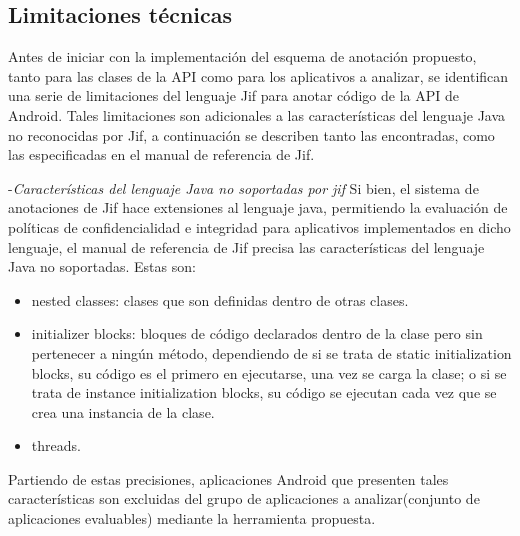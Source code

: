 \subsection{Limitaciones técnicas}
\label{subsec:limitaciones}
Antes de iniciar con la implementación del esquema de anotación propuesto, tanto
para las clases de la API como para los aplicativos a analizar, se
identifican una serie de limitaciones del lenguaje Jif para anotar código de la
API de Android. 
Tales limitaciones son adicionales a las características del lenguaje Java no
reconocidas por Jif, a continuación se describen tanto las encontradas, como las
especificadas en el manual de referencia de Jif.

-\textit{Características del lenguaje Java no soportadas por jif}\newline
Si bien, el sistema de anotaciones de Jif hace extensiones al lenguaje java,
permitiendo la evaluación de políticas de confidencialidad e integridad para
aplicativos implementados en dicho lenguaje, el manual de referencia de Jif
precisa las características del lenguaje Java no soportadas\cite{jifRef}. Estas
son:
\begin{itemize}
  \item nested classes: clases que son definidas dentro de otras clases.
  \item initializer blocks: bloques de código declarados dentro de la clase pero
  sin pertenecer a ningún método, dependiendo de si se trata de static
  initialization blocks, su código es el primero en ejecutarse, una vez se
  carga la clase; o si se trata de instance initialization blocks, su código se
  ejecutan cada vez que se crea una instancia de la clase.
\item threads.
\end{itemize} 
Partiendo de estas precisiones, aplicaciones Android que presenten tales
características son excluidas del grupo de aplicaciones a analizar(conjunto de
aplicaciones evaluables) mediante la herramienta propuesta.


